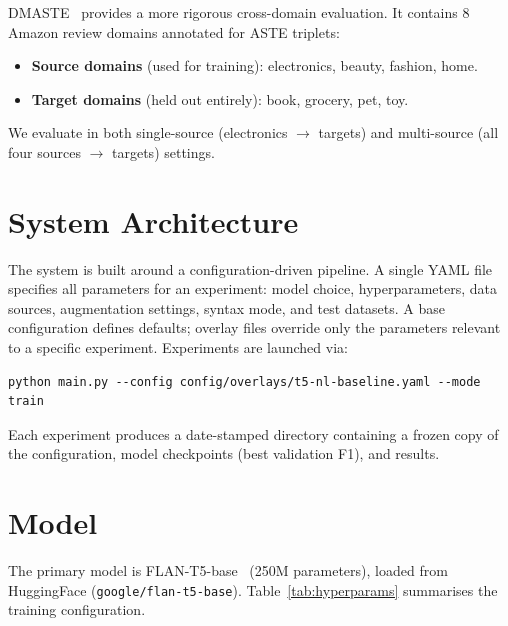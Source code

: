 \documentclass[12pt,a4paper]{report}
\begin{document}
DMASTE~\cite{xu2023dmaste} provides a more rigorous cross-domain evaluation. It contains 8 Amazon review domains annotated for ASTE triplets:

\begin{itemize}
    \item \textbf{Source domains} (used for training): electronics, beauty, fashion, home.
    \item \textbf{Target domains} (held out entirely): book, grocery, pet, toy.
\end{itemize}

We evaluate in both single-source (electronics $\rightarrow$ targets) and multi-source (all four sources $\rightarrow$ targets) settings.


\section{System Architecture}

The system is built around a configuration-driven pipeline. A single YAML file specifies all parameters for an experiment: model choice, hyperparameters, data sources, augmentation settings, syntax mode, and test datasets. A base configuration defines defaults; overlay files override only the parameters relevant to a specific experiment. Experiments are launched via:

\begin{lstlisting}
python main.py --config config/overlays/t5-nl-baseline.yaml --mode train
\end{lstlisting}

Each experiment produces a date-stamped directory containing a frozen copy of the configuration, model checkpoints (best validation F1), and results.


\section{Model}

The primary model is FLAN-T5-base~\cite{chung2022scaling} (250M parameters), loaded from HuggingFace (\texttt{google/flan-t5-base}). Table~\ref{tab:hyperparams} summarises the training configuration.
\end{document}
